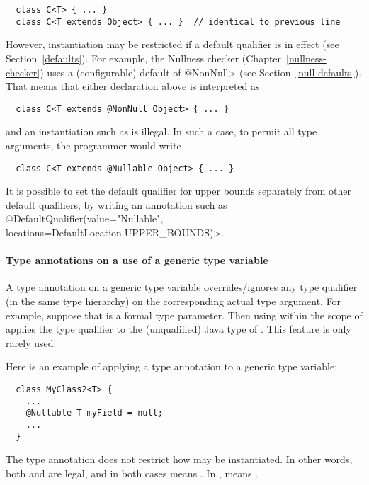 \begin{Verbatim}
  class C<T> { ... }
  class C<T extends Object> { ... }  // identical to previous line
\end{Verbatim}

\noindent
However, instantiation may be restricted if a default qualifier is in
effect (see Section~\ref{defaults}).  For example, the Nullness checker
(Chapter~\ref{nullness-checker}) uses a (configurable) default of
\<@NonNull> (see Section~\ref{null-defaults}).  That means that either
declaration above is interpreted as

\begin{Verbatim}
  class C<T extends @NonNull Object> { ... }
\end{Verbatim}

\noindent
and an instantiation such as  is illegal.
In such a case, to permit all type arguments, the programmer would write

\begin{Verbatim}
  class C<T extends @Nullable Object> { ... }
\end{Verbatim}


It is possible to set the default qualifier for upper bounds separately
from other default qualifiers, by writing an annotation such as
\<@DefaultQualifier(value="Nullable", locations={DefaultLocation.UPPER\_BOUNDS})>.


\paragraph{Type annotations on a use of a generic type variable}

A type annotation on a generic type variable overrides/ignores any type
qualifier (in the same type hierarchy) on the corresponding actual type
argument.  For example, suppose that  is a formal type parameter.
Then using  within the scope of  applies the type
qualifier  to the (unqualified) Java type of .
This feature is only rarely used.

Here is an example of applying a type annotation to a generic type
variable:

\begin{Verbatim}
  class MyClass2<T> {
    ...
    @Nullable T myField = null;
    ...
  }
\end{Verbatim}

\noindent
The type annotation does not restrict how  may be
instantiated.  In other words, both
 and  are
legal, and in both cases  means .
In ,
 means .

